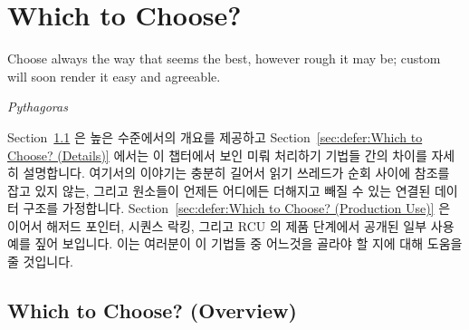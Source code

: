 
\section{Which to Choose?}
\label{sec:defer:Which to Choose?}
%
\epigraph{Choose always the way that seems the best, however rough it
	  may be; custom will soon render it easy and agreeable.}
	  {\emph{Pythagoras}}

Section~\ref{sec:defer:Which to Choose? (Overview)}
은 높은 수준에서의 개요를 제공하고
Section~\ref{sec:defer:Which to Choose? (Details)}
에서는 이 챕터에서 보인 미뤄 처리하기 기법들 간의 차이를 자세히 설명합니다.
여기서의 이야기는 충분히 길어서 읽기 쓰레드가 순회 사이에 참조를 잡고 있지
않는, 그리고 원소들이 언제든 어디에든 더해지고 빼질 수 있는 연결된 데이터
구조를 가정합니다.
Section~\ref{sec:defer:Which to Choose? (Production Use)}
은 이어서 해저드 포인터, 시퀀스 락킹, 그리고 RCU 의 제품 단계에서 공개된 일부
사용 예를 짚어 보입니다.
이는 여러분이 이 기법들 중 어느것을 골라야 할 지에 대해 도움을 줄 것입니다.

\iffalse

Section~\ref{sec:defer:Which to Choose? (Overview)}
provides a high-level overview and then
Section~\ref{sec:defer:Which to Choose? (Details)}
provides a more detailed view
of the differences between the deferred-processing techniques presented
in this chapter.
This discussion assumes a linked data structure that is large enough
that readers do not hold references from one traversal to another,
and where elements might be added to and removed from the structure
at any location and at any time.
Section~\ref{sec:defer:Which to Choose? (Production Use)}
then points out a few publicly visible production uses of
hazard pointers, sequence locking, and RCU\@.
This discussion should help you to make an informed choice between
these techniques.

\fi

\subsection{Which to Choose? (Overview)}
\label{sec:defer:Which to Choose? (Overview)}

